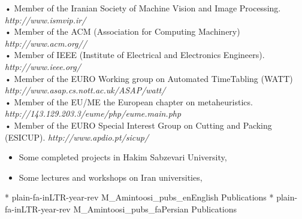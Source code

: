 \documentclass[10pt,a4paper]{moderncv}
\begin{document}
{\small • Member of the Iranian Society of Machine Vision and Image Processing. \hfill {\scriptsize\em http://www.ismvip.ir/}}\\
{\small • Member of the ACM (Association for Computing Machinery) \hfill {\scriptsize\em http://www.acm.org//}}\\
{\small • Member of IEEE (Institute of Electrical and Electronics Engineers). \hfill {\scriptsize\em http://www.ieee.org/}}\\
{\small • Member of the EURO Working group on Automated TimeTabling (WATT) \hfill {\scriptsize\em http://www.asap.cs.nott.ac.uk/ASAP/watt/}}\\
{\small • Member of the EU/ME the European chapter on metaheuristics. \hfill {\scriptsize\em http://143.129.203.3/eume/php/eume.main.php}}\\
{\small • Member of the EURO Special Interest Group on Cutting and Packing (ESICUP). \hfill {\scriptsize\em http://www.apdio.pt/sicup/}}\\

\begin{itemize}
\item Some completed projects in Hakim Sabzevari University, 
\item Some lectures and workshops on Iran universities,
\end{itemize}





\nocite{pubEn}{*}
{plain-fa-inLTR-year-rev}
{M_Amintoosi_pubs_en}{English Publications}
\nocite{pubFa}{*}
{plain-fa-inLTR-year-rev}
{M_Amintoosi_pubs_fa}{Persian Publications}

%
%

%
%
%
\end{document}
